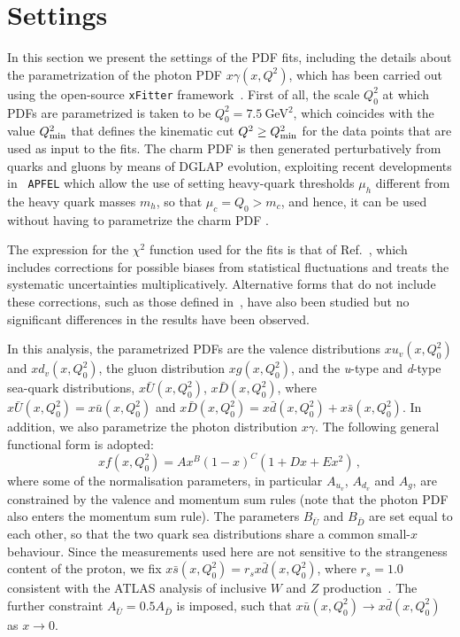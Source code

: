 \section{Settings}
\label{sec:fitsettings}

In this section we present the settings of the PDF fits, including the details about the
parametrization of the photon PDF $x\gamma(x,Q^2)$, which has been
carried out using the open-source {\tt xFitter}
framework~\cite{Alekhin:2014irh}.
%
First of all, the scale $Q_0^2$ at which PDFs are parametrized is taken to be
$Q_0^2 = 7.5~$GeV$^2$, which coincides with the value $Q_{\rm min}^2$ that defines
the kinematic cut $Q^2 \ge Q_{\rm min}^2$ for the
data points that are used as input to the fits.
%
The charm PDF is then generated perturbatively from quarks and gluons by
means of DGLAP evolution, exploiting recent developments in {\tt
  APFEL} which allow the use of setting heavy-quark thresholds $\mu_h$
different from the heavy quark masses $m_h$, so that
$\mu_c=Q_0 > m_c$, and hence, it can be used without having to parametrize the charm PDF \cite{current:work}.

The expression for the $\chi^2$  function used for the fits is that
of Ref.~\cite{Aaron:2012qi}, which
includes corrections for possible 
biases from statistical fluctuations and treats the systematic uncertainties
multiplicatively.
%
Alternative forms that do not include these corrections, such as those
defined in~\cite{Aaron:2009aa,Abramowicz:2015mha},
have also been studied but no significant differences
in the results have been observed.
%

In this analysis, the parametrized PDFs are the valence distributions
$xu_{v}(x,Q_0^2)$ and $xd_{v}(x,Q_0^2)$, the gluon distribution $xg(x,Q_0^2)$, and the
\textit{u}-type and \textit{d}-type sea-quark distributions,
$x\bar{U}(x,Q_0^2)$, $x\bar{D}(x,Q_0^2)$, where $x\bar{U}(x,Q_0^2) = x\bar{u}(x,Q_0^2)$ and
$x\bar{D}(x,Q_0^2) = x\bar{d}(x,Q_0^2) + x\bar{s}(x,Q_0^2)$.
%
In addition, we also parametrize the photon distribution $x\gamma$.
%
The following general functional form is adopted:
\begin{equation}
  \label{eq:parametrization}
xf(x, Q_0^2) = Ax^{B}(1-x)^{C}(1+Dx+Ex^{2}) \, ,
\end{equation}
where some of the normalisation parameters, in particular $A_{u_{v}}$,
$A_{d_{v}}$ and $A_{g}$, are constrained by the valence and momentum
sum rules (note that the photon PDF also enters the momentum sum rule).
%
The parameters $B_{\bar{U}}$ and $B_{\bar{D}}$ are set equal to each
other, so that the two quark sea distributions share a common
small-$x$ behaviour.
%
Since the measurements used here are not sensitive to the strangeness
content of the proton, we fix $x\bar{s} (x, Q_0^2) = r_sx\bar{d}(x,Q_0^2)$, where
$r_s=1.0$ consistent with the ATLAS analysis of inclusive $W$
and $Z$ production~\cite{Aad:2012sb,Aaboud:2016btc}.
%
The further constraint $A_{\bar{U}} = 0.5 A_{\bar{D}}$ is imposed,
such that $x\bar{u}(x,Q_0^2) \to x\bar{d}(x,Q_0^2)$ as $x \to 0$.  

